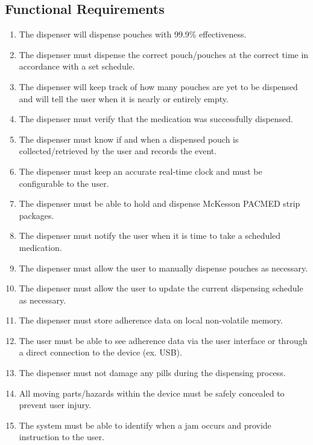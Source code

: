 \documentclass[12pt]{article}
\begin{document}
\subsection{Functional Requirements}
\begin{enumerate}
    \item The dispenser will dispense pouches with 99.9\% effectiveness.
    \item The dispenser must dispense the correct pouch/pouches at the correct time in accordance with a set schedule.
    \item The dispenser will keep track of how many pouches are yet to be dispensed and will tell the user when it is nearly or entirely empty.
    \item The dispenser must verify that the medication was successfully dispensed.
    \item The dispenser must know if and when a dispensed pouch is collected/retrieved by the user and records the event.
    \item The dispenser must keep an accurate real-time clock and must be configurable to the user.
    \item The dispenser must be able to hold and dispense McKesson PACMED strip packages.
    \item The dispenser must notify the user when it is time to take a scheduled medication.
    \item The dispenser must allow the user to manually dispense pouches as necessary. 
    \item The dispenser must allow the user to update the current dispensing schedule as necessary.
    \item The dispenser must store adherence data on local non-volatile memory.
    \item The user must be able to see adherence data via the user interface or through a direct connection to the device (ex. USB).
    \item The dispenser must not damage any pills during the dispensing process.
    \item All moving parts/hazards within the device must be safely concealed to prevent user injury.
    \item The system must be able to identify when a jam occurs and provide instruction to the user.
\end{enumerate}
\end{document}
